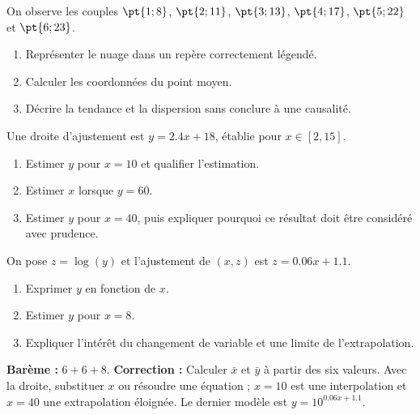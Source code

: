 \begin{exercise}
On observe les couples $\pt{1;8}$, $\pt{2;11}$, $\pt{3;13}$, $\pt{4;17}$, $\pt{5;22}$ et $\pt{6;23}$.
\begin{enumerate}
\item Représenter le nuage dans un repère correctement légendé.
\item Calculer les coordonnées du point moyen.
\item Décrire la tendance et la dispersion sans conclure à une causalité.
\end{enumerate}
\end{exercise}
\begin{exercise}
Une droite d'ajustement est $y=\num{2,4}x+18$, établie pour $x\in[2,15]$.
\begin{enumerate}
\item Estimer $y$ pour $x=10$ et qualifier l'estimation.
\item Estimer $x$ lorsque $y=60$.
\item Estimer $y$ pour $x=40$, puis expliquer pourquoi ce résultat doit être considéré avec prudence.
\end{enumerate}
\end{exercise}
\begin{exercise}
On pose $z=\log(y)$ et l'ajustement de $(x,z)$ est $z=\num{0,06}x+\num{1,1}$.
\begin{enumerate}
\item Exprimer $y$ en fonction de $x$.
\item Estimer $y$ pour $x=8$.
\item Expliquer l'intérêt du changement de variable et une limite de l'extrapolation.
\end{enumerate}
\end{exercise}
\begin{solution}\textbf{Barème :} $6+6+8$. \textbf{Correction :} Calculer $\bar x$ et $\bar y$ à partir des six valeurs. Avec la droite, substituer $x$ ou résoudre une équation ; $x=10$ est une interpolation et $x=40$ une extrapolation éloignée. Le dernier modèle est $y=10^{\num{0,06}x+\num{1,1}}$.\end{solution}


